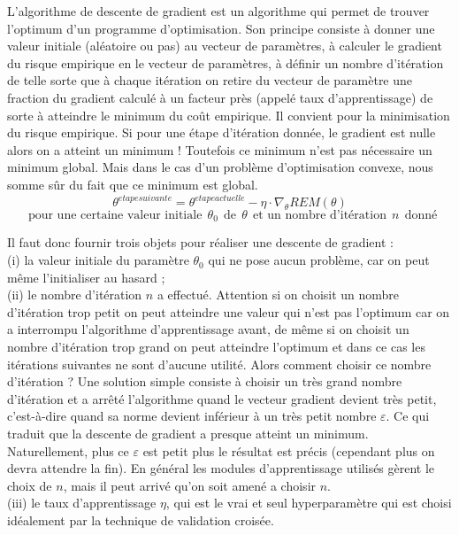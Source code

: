 \documentclass[executivepaper]{article}
\begin{document}
\begin{itemize}
L'algorithme de descente de gradient est un algorithme qui permet de trouver l'optimum d'un programme d'optimisation. Son principe consiste à donner une valeur initiale (aléatoire ou pas) au vecteur de paramètres, à calculer le gradient du risque empirique en le vecteur de paramètres, à définir un nombre d'itération de telle sorte que à chaque itération on retire du vecteur de paramètre une fraction du gradient calculé à un facteur près (appelé taux d'apprentissage) de sorte à atteindre le minimum du coût empirique. Il convient pour la minimisation du risque empirique. Si pour une étape d'itération donnée, le gradient est nulle alors on a atteint un minimum ! Toutefois ce minimum n'est pas nécessaire un minimum global. Mais dans le cas d'un problème d'optimisation convexe, nous somme sûr du fait que ce minimum est global.\\

$$\theta^{etape suivante} = \theta^{etape actuelle} - \eta \cdot \nabla_\theta REM(\theta)$$
$$ \:\: \text{pour une certaine valeur initiale} \:\: \theta_0 \:\: \text{de} \:\: \theta \:\: \text{et un nombre d'itération} \:\: n \:\: \text{donné} $$

Il faut donc fournir trois objets pour réaliser une descente de gradient : \\

(i) la valeur initiale du paramètre $\theta_0$ qui ne pose aucun problème, car on peut même l'initialiser au hasard ;\\
 
 (ii) le nombre d'itération $n$ a effectué. Attention si on choisit un nombre d'itération trop petit on peut atteindre une valeur qui n'est pas l'optimum car on a interrompu l'algorithme d'apprentissage avant, de même si on choisit un nombre d'itération trop grand on peut atteindre l'optimum et dans ce cas les itérations suivantes ne sont d'aucune utilité. Alors comment choisir ce nombre d'itération ? Une solution simple consiste à choisir un très grand nombre d'itération et a arrêté l'algorithme quand le vecteur gradient devient très petit, c'est-à-dire quand sa norme devient inférieur à un très petit nombre $\varepsilon$. Ce qui traduit que la descente de gradient a presque atteint un minimum. Naturellement, plus ce $\varepsilon$ est petit plus le résultat est précis (cependant plus on devra attendre la fin). En général les modules d'apprentissage utilisés gèrent le choix de $n$, mais il peut arrivé qu'on soit amené a choisir $n$.\\
 
 (iii) le taux d'apprentissage $\eta$, qui est le vrai et seul hyperparamètre qui est choisi idéalement par la technique de validation croisée.\\
 


\end{itemize}
\end{document}
